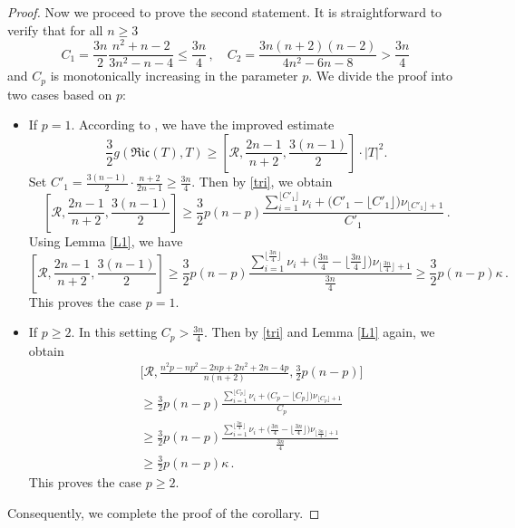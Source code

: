 \documentclass[12pt, twoside]{article}
\theoremstyle{definition}
\numberwithin{equation}{section}
\begin{document}
\begin{proof}
Now we proceed to prove the second statement. It is straightforward to verify that for all $n\geq 3$
\[
C_1=\frac{3n}{2}\frac{n^2+n-2}{3n^2-n-4}\leq \frac{3n}{4}\,, \quad C_2=\frac{3n(n+2)(n-2)}{4n^2-6n-8}>\frac{3n}{4} 
\]
and $C_{p}$ is monotonically increasing in the parameter $p$. We divide the proof into two cases based on $p$:
\begin{itemize}
\item[(i)] If $p=1$. According to \cite[Remark 3.16]{NPW23}, we have the improved estimate
\begin{equation*}
\frac{3}{2}g(\mathfrak{Ric}(T),T) \geq \left[\mathcal{R}, \frac{2n-1}{n+2}, \frac{3(n-1)}{2}\right] \cdot |T|^2.
\end{equation*}
Set $C'_{1}=\frac{3(n-1)}{2} \cdot \frac{n+2}{2n-1}\geq \frac{3n}{4}$. Then by \eqref{tri}, we obtain
\[
\left[\mathcal{R}, \frac{2n-1}{n+2}, \frac{3(n-1)}{2}\right]\geq \frac{3}{2}p(n-p)\frac{\sum_{i=1}^{\lfloor C'_{1}\rfloor}\nu_{i}+\big(C'_{1}-\lfloor C'_{1}\rfloor\big)\nu_{\lfloor C'_{1}\rfloor+1}}{C'_{1}}\,. 
\]
Using Lemma \ref{L1}, we have
\[
\left[\mathcal{R}, \frac{2n-1}{n+2}, \frac{3(n-1)}{2}\right]\geq \frac{3}{2}p(n-p)\frac{\sum_{i=1}^{\lfloor \frac{3n}{4}\rfloor}\nu_{i}+\big(\frac{3n}{4}-\lfloor \frac{3n}{4}\rfloor\big)\nu_{\lfloor \frac{3n}{4}\rfloor+1}}{\frac{3n}{4}}\geq \frac{3}{2}p(n-p)\kappa\,. 
\]
This proves the case $p=1$.
\item[(ii)] If $p\geq 2$. In this setting $C_p>\frac{3n}{4}$. Then by \eqref{tri} and Lemma \ref{L1} again, we obtain
\[
\begin{split}
& \Big[\mathcal{R},\frac{n^{2}p-np^{2}-2np+2n^{2}+2n-4p}{n(n+2)},\frac{3}{2}p(n-p) \Big]\\
& \geq  \frac{3}{2}p(n-p)\frac{\sum_{i=1}^{\lfloor C_{p}\rfloor}\nu_{i}+\big(C_{p}-\lfloor C_{p}\rfloor\big)\nu_{\lfloor C_{p}\rfloor+1}}{C_{p}}\\
& \geq  \frac{3}{2}p(n-p)\frac{\sum_{i=1}^{\lfloor \frac{3n}{4}\rfloor}\nu_{i}+\big(\frac{3n}{4}-\lfloor \frac{3n}{4}\rfloor\big)\nu_{\lfloor \frac{3n}{4}\rfloor+1}}{\frac{3n}{4}}\\
& \geq \frac{3}{2}p(n-p)\kappa\,. 
\end{split}  
\]
This proves the case $p\geq  2$.
\end{itemize}
Consequently, we complete the proof of the corollary.
\end{proof}
\end{document}
